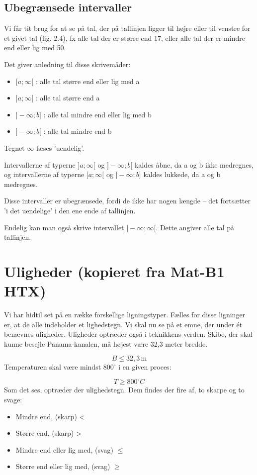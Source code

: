 \documentclass[12pt,oneside,a4paper]{article}
\begin{document}
\subsection{Ubegrænsede intervaller}
Vi får tit brug for at se på tal, der på tallinjen ligger til højre eller til
venstre for et givet tal (fig. 2.4), fx alle tal der er større end 17, eller
alle tal der er mindre end eller lig med 50.

Det giver anledning til disse skrivemåder:

\begin{itemize}
    \item $[a;\infty[$  : alle tal større end eller lig med a
    \item $]a;\infty[$  : alle tal større end a
    \item $]-\infty;b]$ : alle tal mindre end eller lig med b
    \item $]-\infty;b[$ : alle tal mindre end b
\end{itemize}
Tegnet $\infty$ læses ’uendelig’.

Intervallerne af typerne $]a;\infty [$ og $]-\infty ;b[$ kaldes åbne, da a og b
ikke medregnes, og intervallerne af typerne $[a;\infty [$ og $]-\infty ;b]$
kaldes lukkede, da a og b medregnes.

Disse intervaller er ubegrænsede, fordi de ikke har nogen længde – det
fortsætter ’i det uendelige’ i den ene ende af tallinjen.

Endelig kan man også skrive intervallet $]-\infty ;\infty [$. Dette angiver
alle tal på tallinjen.

\section{Uligheder (kopieret fra Mat-B1 HTX)}
Vi har hidtil set på en række forskellige ligningstyper. Fælles for disse
ligninger er, at de alle indeholder et lighedstegn. Vi skal nu se på et emne,
der under ét benævnes uligheder. Uligheder optræder også i teknikkens verden.
Skibe, der skal kunne besejle Panama-kanalen, må højest være 32,3 meter bredde.

$$
B\leq 32,3 \, \text{m}
$$
Temperaturen skal være mindst $800^\circ$ i en given proces:


$$
T \geq 800 ^\circ C
$$
Som det ses, optræder der ulighedstegn. Dem findes der fire af, to skarpe og to svage:

\begin{itemize}
    \item Mindre end, (skarp)  <
    \item Større end, (skarp) >
    \item Mindre end eller lig med, (svag) $\leq$
    \item Større end eller lig med, (svag) $\geq$
\end{itemize}
\end{document}
